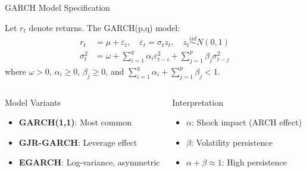 \documentclass[9pt, aspectratio=169, t]{beamer}
\begin{document}
\begin{frame}{GARCH Model Specification}
    \vspace{-0.1cm}
    \begin{defn}
        Let $r_t$ denote returns. The GARCH(p,q) model:
        \vspace{-0.2cm}
        \begin{align*}
            r_t &= \mu + \varepsilon_t, \quad \varepsilon_t = \sigma_t z_t, \quad z_t \stackrel{iid}{\sim} N(0,1) \\
            \sigma_t^2 &= \omega + \sum_{i=1}^{q}\alpha_i \varepsilon_{t-i}^2 + \sum_{j=1}^{p}\beta_j \sigma_{t-j}^2
        \end{align*}
        \vspace{-0.3cm}
        where $\omega > 0$, $\alpha_i \geq 0$, $\beta_j \geq 0$, and $\sum_{i=1}^{q} \alpha_i + \sum_{j=1}^{p} \beta_j < 1$.
    \end{defn}

    \begin{columns}[T]
        \begin{block}{Model Variants}
            \begin{itemize}\setlength{\itemsep}{0pt}
                \item \textbf{GARCH(1,1)}: Most common
                \item \textbf{GJR-GARCH}: Leverage effect
                \item \textbf{EGARCH}: Log-variance, asymmetric
            \end{itemize}
        \end{block}

        \begin{block}{Interpretation}
            \begin{itemize}\setlength{\itemsep}{0pt}
                \item $\alpha$: Shock impact (ARCH effect)
                \item $\beta$: Volatility persistence
                \item $\alpha + \beta \approx 1$: High persistence
            \end{itemize}
        \end{block}
    \end{columns}
\end{frame}
\end{document}

